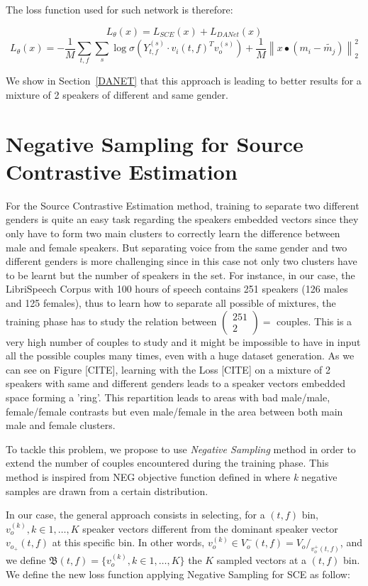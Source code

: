 \documentclass[master,final,11pt]{iscs-thesis}
\newcommand{\norm}[1]{\left\lVert#1\right\rVert}
\begin{document}
The loss function used for such network is therefore:

\[L_\theta(x) = L_{SCE}(x) + L_{DANet}(x)\]
\[L_\theta(x) = - \frac{1}{M} \sum_{t,f} \sum_{s} \log \sigma(Y_{t,f}^{(s)} \cdot v_i(t,f)^{T} v_o^{(s)}) + \frac{1}{M} \norm{x \bullet (m_i - \tilde{m_j})}^2_2\]

We show in Section~\ref{DANET} that this approach is leading to better results for a mixture of 2 speakers of different and same gender.


\section{Negative Sampling for Source Contrastive Estimation}

For the Source Contrastive Estimation method, training to separate two different genders is quite an easy task regarding the speakers embedded vectors since they only have to form two main clusters to correctly learn the difference between male and female speakers. But separating voice from the same gender and two different genders is more challenging since in this case not only two clusters have to be learnt but the number of speakers in the set. For instance, in our case, the LibriSpeech Corpus with 100 hours of speech contains 251 speakers (126 males and 125 females), thus to learn how to separate all possible of mixtures, the training phase has to study the relation between $\left(\! \begin{array}{c} 251 \\ 2 \end{array} \!\right) = $ couples. This is a very high number of couples to study and it might be impossible to have in input all the possible couples many times, even with a huge dataset generation. As we can see on Figure [CITE], learning with the Loss [CITE] on a mixture of 2 speakers with same and different genders leads to a speaker vectors embedded space forming a 'ring'. This repartition leads to areas with bad male/male, female/female contrasts but even male/female in the area between both main male and female clusters. 

To tackle this problem, we propose to use \textit{Negative Sampling} method in order to extend the number of couples encountered during the training phase. This method is inspired from NEG objective function  defined in \cite{NS} where \textit{k} negative samples are drawn from a certain distribution. 

In our case, the general approach consists in selecting, for a $(t,f)$ bin, $v_o^{(k)}, k \in 1,\dotsc,K$ speaker vectors different from the dominant speaker vector $v_{o_{+}}(t,f)$ at this specific bin. In other words, $v_o^{(k)} \in V_o^-(t,f) = V_o/_{v_o^+(t,f)}$, and we define $\mathfrak{B}(t,f) = \{v_o^{(k)}, k \in 1,\dotsc,K\}$ the $K$ sampled vectors at a $(t,f)$ bin. We define the new loss function applying Negative Sampling for SCE as follow:
\end{document}
